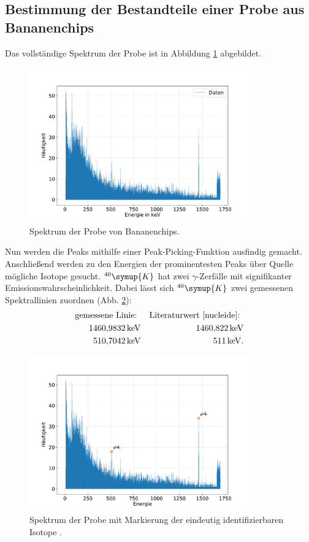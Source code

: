 \subsection{Bestimmung der Bestandteile einer Probe aus Bananenchips}
Das vollständige Spektrum der Probe ist in Abbildung \ref{fig:banane_spectrum} abgebildet.
\begin{figure}[h!]
  \centering
  \includegraphics[width=0.85\textwidth]{content/images/bananium_vollesspektrum.pdf}
  \caption{Spektrum der Probe von Bananenchips.}
  \label{fig:banane_spectrum}
\end{figure}
Nun werden die Peaks mithilfe einer Peak-Picking-Funktion ausfindig gemacht.
Anschließend werden zu den Energien der prominentesten Peaks über Quelle \cite{nucleide} mögliche Isotope gesucht.
$^{40}\symup{K}$ hat zwei $\gamma$-Zerfälle mit signifikanter Emissionswahrscheinlichkeit.
Dabei lässt sich $^{40}\symup{K}$ zwei gemessenen Spektrallinien zuordnen (Abb. \ref{fig:bananium_mark}):
\begin{align*}
    \text{gemessene Linie: }            && \text{Literaturwert \cite{nucleide}: }\\
    \SI{1460.9832}{\kilo \electronvolt} && \SI{1460.822}{\kilo \electronvolt} \\
    \SI{510.7042}{\kilo \electronvolt}  && \SI{511}{\kilo \electronvolt} . \\
\end{align*}
\begin{figure}[h!]
  \centering
  \includegraphics[width=0.85\textwidth]{content/images/bananium_markiert.pdf}
  \caption{Spektrum der Probe mit Markierung der eindeutig identifizierbaren Isotope \cite{nucleide}.}
  \label{fig:bananium_mark}
\end{figure}
\FloatBarrier
